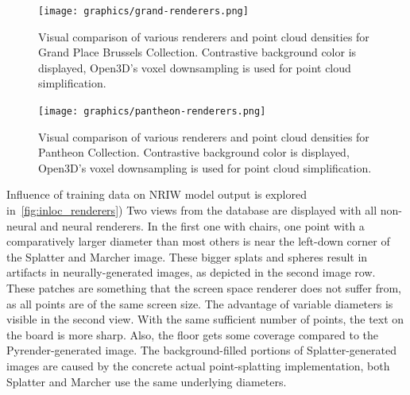 \begin{figure}
    \centering
    \texttt{[image: graphics/grand-renderers.png]}
    \caption[Visual comparison of various renderers and point cloud
    densities for Grand Place Brussels Collection]{Visual comparison
    of various renderers and point cloud densities for Grand Place Brussels
    Collection. Contrastive background color is displayed, Open3D's
    voxel downsampling is used for point cloud simplification.}
    \label{fig:grand_renderers}
\end{figure}

\begin{figure}
    \centering
    \texttt{[image: graphics/pantheon-renderers.png]}
    \caption[Visual comparison of various renderers and point cloud
    densities for Pantheon Collection]{Visual comparison of various
    renderers and point cloud densities for Pantheon Collection.
    Contrastive background color is displayed, Open3D's voxel downsampling is used
    for point cloud simplification.}
    \label{fig:pantheon_renderers}
\end{figure}

Influence of training data on NRIW model output is explored
in~\cref{fig:inloc_renderers}) Two views from the database are displayed
with all non-neural and neural renderers. In the first one with chairs,
one point with a comparatively larger diameter than most others is
near the left-down corner of the Splatter and Marcher image. These bigger splats
and spheres result in artifacts in neurally-generated images, as
depicted in the second image row. These patches are something that the screen space
renderer does not suffer from, as all points are of the same screen size.
The advantage of variable diameters
is visible in the second view. With the same sufficient number of points,
the text on the board is more sharp. Also, the floor gets some coverage
compared to the Pyrender-generated image. The background-filled portions of
Splatter-generated images are caused by the concrete actual point-splatting
implementation, both Splatter and Marcher use the same underlying diameters.\\

